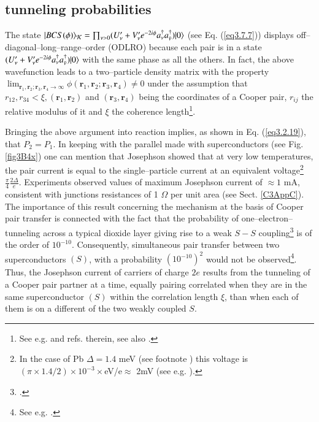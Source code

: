 \begin{subappendices}
 \subsection{tunneling probabilities}
 The state $ |{BCS(\phi)} \rangle_{\mathcal K}=\prod_{\nu>0}(U'_\nu+V'_\nu e^{-2i\phi} a_\nu^\dagger a_{\bar{\nu}}^\dagger)|{0} \rangle$ (see Eq. (\ref{eq3.7.7})) displays off--diagonal--long--range--order (ODLRO) because each pair is in a state $(U'_\nu+V'_\nu e^{-2i\phi} a_\nu^\dagger a_{\bar{\nu}}^\dagger)|{0} \rangle$ with the same phase as all the others. In fact, the above wavefunction  leads to a two--particle density matrix with the property $\lim_{\mathbf r_1, \mathbf r_2;\mathbf r_3, \mathbf r_4\rightarrow\infty}\phi(\mathbf r_1, \mathbf r_2;\mathbf r_3, \mathbf r_4)\neq 0$ under the assumption that $r_{12}, r_{34}<\xi, (\mathbf r_1, \mathbf r_2)$ and $(\mathbf r_3, \mathbf r_4)$ being the coordinates of a Cooper pair, $r_{ij}$ the relative modulus of it and $\xi$ the coherence length\footnote{See e.g. \cite{Ambegaokar:69} and refs. therein, see also \cite{Potel:17}.}.
 
 
Bringing the above argument into reaction implies, as shown in Eq. (\ref{eq3.2.19}), that $P_2=P_1$.
In keeping with the parallel made with superconductors (see Fig. \ref{fig3B4x}) one can mention that Josephson showed that at very low temperatures, the pair current is equal to the single--particle current at an equivalent voltage\footnote{In the case of Pb $\Delta=1.4$ meV (see footnote \footnotemark[\ref{foot75}]) this voltage is $(\pi\times1.4/2)\times 10^{-3}\times$eV/e$\approx$ 2mV (see e.g. \cite{McDonald:01}).} $\frac{\pi}{4}\frac{2\Delta}{e}$. Experiments observed values of maximum Josephson current of $\approx1$ mA, consistent with junctions resistances of 1 $\Omega$ per unit area (see Sect. \ref{C3AppC}). The importance of this result  concerning the mechanism at the basis of Cooper pair transfer is connected with the fact that the probability of one--electron--tunneling across a typical dioxide layer giving rise to a weak $S-S$ coupling\footnote{\cite{Pippard:12}.} is of the order of $10^{-10}$. Consequently, simultaneous pair transfer between two superconductors $(S)$, with a probability  $(10^{-10})^2$ would not be observed\footnote{See e.g. \cite{McDonald:01}.}. Thus, the Josephson current of carriers of charge $2e$ results from the tunneling of a Cooper pair partner at a time, equally pairing correlated when they are in the same superconductor $(S)$ within the correlation length $\xi$, than when each of them is on a different of the two weakly coupled $S$. 



\end{subappendices}
